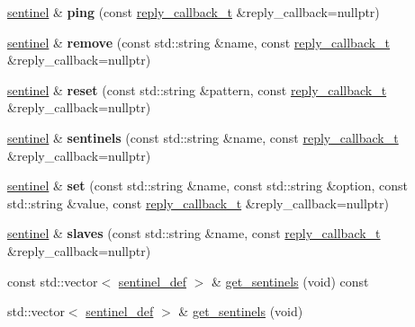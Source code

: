 \begin{DoxyCompactItemize}
\hyperlink{classcpp__redis_1_1sentinel}{sentinel} \& {\bfseries ping} (const \hyperlink{classcpp__redis_1_1sentinel_ae1a150ff8787208c47414397a061c9a7}{reply\+\_\+callback\+\_\+t} \&reply\+\_\+callback=nullptr)
\item 
\mbox{\label{classcpp__redis_1_1sentinel_aee344f7f63bc02d13cb9dce08d48d5d9}} 
\hyperlink{classcpp__redis_1_1sentinel}{sentinel} \& {\bfseries remove} (const std\+::string \&name, const \hyperlink{classcpp__redis_1_1sentinel_ae1a150ff8787208c47414397a061c9a7}{reply\+\_\+callback\+\_\+t} \&reply\+\_\+callback=nullptr)
\item 
\mbox{\label{classcpp__redis_1_1sentinel_a11d5f170474aa881df3b6f3cbbde3569}} 
\hyperlink{classcpp__redis_1_1sentinel}{sentinel} \& {\bfseries reset} (const std\+::string \&pattern, const \hyperlink{classcpp__redis_1_1sentinel_ae1a150ff8787208c47414397a061c9a7}{reply\+\_\+callback\+\_\+t} \&reply\+\_\+callback=nullptr)
\item 
\mbox{\label{classcpp__redis_1_1sentinel_a38436712626f27867ecff225eed87a7f}} 
\hyperlink{classcpp__redis_1_1sentinel}{sentinel} \& {\bfseries sentinels} (const std\+::string \&name, const \hyperlink{classcpp__redis_1_1sentinel_ae1a150ff8787208c47414397a061c9a7}{reply\+\_\+callback\+\_\+t} \&reply\+\_\+callback=nullptr)
\item 
\mbox{\label{classcpp__redis_1_1sentinel_a1579c9c9b8ac3cded0a7d70e709e5e1b}} 
\hyperlink{classcpp__redis_1_1sentinel}{sentinel} \& {\bfseries set} (const std\+::string \&name, const std\+::string \&option, const std\+::string \&value, const \hyperlink{classcpp__redis_1_1sentinel_ae1a150ff8787208c47414397a061c9a7}{reply\+\_\+callback\+\_\+t} \&reply\+\_\+callback=nullptr)
\item 
\mbox{\label{classcpp__redis_1_1sentinel_aa4b19659807388d276764f9a79132d00}} 
\hyperlink{classcpp__redis_1_1sentinel}{sentinel} \& {\bfseries slaves} (const std\+::string \&name, const \hyperlink{classcpp__redis_1_1sentinel_ae1a150ff8787208c47414397a061c9a7}{reply\+\_\+callback\+\_\+t} \&reply\+\_\+callback=nullptr)
\item 
const std\+::vector$<$ \hyperlink{classcpp__redis_1_1sentinel_1_1sentinel__def}{sentinel\+\_\+def} $>$ \& \hyperlink{classcpp__redis_1_1sentinel_adec98cdde0500e44b8fda26a44f14b49}{get\+\_\+sentinels} (void) const
\item 
std\+::vector$<$ \hyperlink{classcpp__redis_1_1sentinel_1_1sentinel__def}{sentinel\+\_\+def} $>$ \& \hyperlink{classcpp__redis_1_1sentinel_a62cc14b7795d746cc7d0053c1e0a3abd}{get\+\_\+sentinels} (void)
\end{DoxyCompactItemize}


